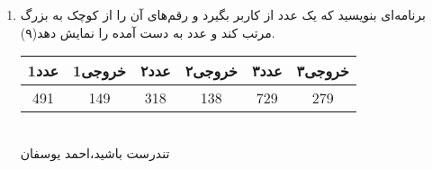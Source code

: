 \documentclass[12pt, a4paper]{article}
\begin{document}
\begin{enumerate}
\item
برنامه‌ای بنویسید که یک عدد از کاربر بگیرد و  رقم‌های آن را از کوچک به بزرگ مرتب کند و عدد به دست آمده را نمایش دهد(۹).
\\
\begin{center} 
\begin{tabular}{| c   | c | c  | c | c| c |}
\hline
   عدد1  & 
خروجی1  & 
عدد۲    & 
خروجی۲  & 
عدد۳     & 
خروجی۳ 
    \tabularnewline 
\hline
 491 &  149   &  318 & 138  &  729  & 279 \\
\hline \end{tabular} \end{center}
\\ %
تندرست باشید،‌احمد یوسفان
\end{enumerate}
\end{document}

